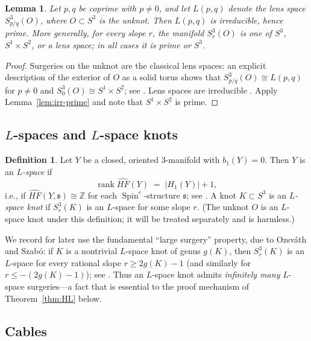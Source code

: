 \documentclass[11pt]{article}
\newtheorem{lemma}[theorem]{Lemma}
\theoremstyle{definition}
\newtheorem{definition}[theorem]{Definition}
\theoremstyle{remark}
\numberwithin{equation}{section}
\begin{document}
\begin{lemma}\label{lem:lens}
Let $p,q$ be coprime with $p\neq 0$, and let
$L(p,q)$ denote the lens space $S^{3}_{p/q}(O)$, where $O\subset S^{3}$
is the unknot.  Then $L(p,q)$ is irreducible, hence prime.  More
generally, for every slope $r$, the manifold $S^{3}_{r}(O)$ is one of
$S^{3}$, $S^{1}\times S^{2}$, or a lens space; in all cases it is prime
or $S^{3}$.
\end{lemma}

\begin{proof}
Surgeries on the unknot are the classical lens spaces: an explicit
description of the exterior of $O$ as a solid torus shows that
$S^{3}_{p/q}(O)\cong L(p,q)$ for $p\neq 0$ and
$S^{3}_{0}(O)\cong S^{1}\times S^{2}$; see \cite[Chapter~9]{Ro90}.  Lens
spaces are irreducible \cite{He76,Ro90}.  Apply
Lemma~\ref{lem:irr-prime} and note that $S^{1}\times S^{2}$ is prime.
\end{proof}

\subsection{$L$-spaces and $L$-space knots}

\begin{definition}\label{def:lspace}
Let $Y$ be a closed, oriented $3$-manifold with
$b_{1}(Y)=0$.  Then $Y$ is an \emph{$L$-space} if
\[
\operatorname{rank}\widehat{HF}(Y)\;=\;\left|H_{1}(Y)\right|+1,
\]
i.e., if $\widehat{HF}(Y,\mathfrak{s})\cong\mathbb{Z}$ for each
$\operatorname{Spin}^{c}$-structure $\mathfrak{s}$; see
\cite{OSz04a,OSz04b}.  A knot $K\subset S^{3}$ is an \emph{$L$-space
knot} if $S^{3}_{r}(K)$ is an $L$-space for some slope $r$.  (The unknot
$O$ is an $L$-space knot under this definition; it will be treated
separately and is harmless.)
\end{definition}

We record for later use the fundamental ``large surgery'' property, due
to Ozsv\'ath and Szab\'o: if $K$ is a nontrivial $L$-space knot of genus
$g(K)$, then $S^{3}_{r}(K)$ is an $L$-space for every rational slope
$r\ge 2g(K)-1$ (and similarly for $r\le -(2g(K)-1)$); see
\cite{OSz05}.  Thus an $L$-space knot admits \emph{infinitely many}
$L$-space surgeries---a fact that is essential to the proof mechanism of
Theorem~\ref{thm:HL} below.

\subsection{Cables}\label{sec:cable-def}
\end{document}
